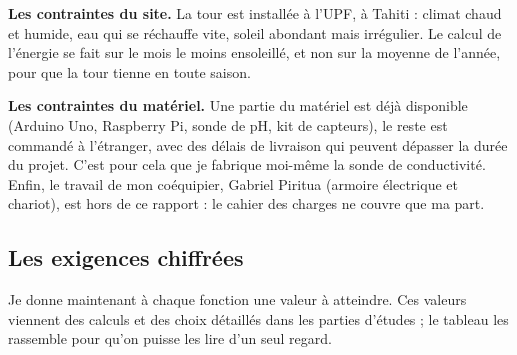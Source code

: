 \textbf{Les contraintes du site.} La tour est installée à l'UPF, à Tahiti : climat chaud et humide, eau qui se réchauffe vite, soleil abondant mais irrégulier. Le calcul de l'énergie se fait sur le mois le moins ensoleillé, et non sur la moyenne de l'année, pour que la tour tienne en toute saison.

\textbf{Les contraintes du matériel.} Une partie du matériel est déjà disponible (Arduino Uno, Raspberry Pi, sonde de pH, kit de capteurs), le reste est commandé à l'étranger, avec des délais de livraison qui peuvent dépasser la durée du projet. C'est pour cela que je fabrique moi-même la sonde de conductivité. Enfin, le travail de mon coéquipier, Gabriel Piritua (armoire électrique et chariot), est hors de ce rapport : le cahier des charges ne couvre que ma part.

\subsection{Les exigences chiffrées}

Je donne maintenant à chaque fonction une valeur à atteindre. Ces valeurs viennent des calculs et des choix détaillés dans les parties d'études ; le tableau les rassemble pour qu'on puisse les lire d'un seul regard.

